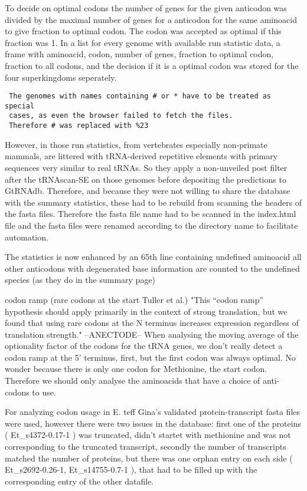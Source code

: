To decide on optimal codons the number of genes for the given anticodon was divided by the maximal number of genes for a anticodon for the same aminoacid to give fraction to optimal codon. The codon was accepted as optimal if this fraction was 1. In a list for every genome with available run statistic data, a frame with aminoacid, codon, number of genes, fraction to optimal codon, fraction to all codons, and the decision if it is a optimal codon was stored for the four superkingdoms seperately.
 
\begin{verbatim}
 The genomes with names containing # or * have to be treated as special 
 cases, as even the browser failed to fetch the files. 
 Therefore # was replaced with %23
\end{verbatim}

However, in those run statistics, from vertebrates especially non-primate mammals, are littered with tRNA-derived repetitive elements with primary sequences very similar to real tRNAs. So they apply a non-unveiled post filter after the tRNAscan-SE on those genomes before depositing the predictions to GtRNAdb. Therefore, and because they were not willing to share the database with the summary statistics, these had to be rebuild from scanning the headers of the fasta files. Therefore the fasta file name had to be scanned in the index.html file and the fasta files were renamed according to the directory name to facilitate automation. 

The statistics is now enhanced by an 65th line containing undefined aminoacid all other anticodons with degenerated base information are counted to the undefined species (as they do in the summary page)

codon ramp (rare codons at the start Tuller et al.) "This “codon ramp” hypothesis should apply primarily in the context of strong translation, but we found that using rare codons at the N terminus increases expression regardless of translation strength." --ANECTODE-- When analysing the moving average of the optionality factor of the codons for the tRNA genes, we don't really detect a codon ramp at the 5' terminus, first, but the first codon was always optimal. No wonder because there is only one codon for Methionine, the start codon. Therefore we should only analyse the aminoacids that have a choice of anti-codons to use.  

For analyzing codon usage in E. teff Gina's validated protein-transcript fasta files were used, however there were two issues in the database: 
first one of the proteins (
Et\_s4372-0.17-1
) was truncated, didn't startet with methionine and was not corresponding to the truncated transcript, secondly the number of transcripts matched the number of proteins, but there was one orphan entry on each side (
Et\_s2692-0.26-1, Et\_s14755-0.7-1
), that had to be filled up with the corresponding entry of the other datafile. 


